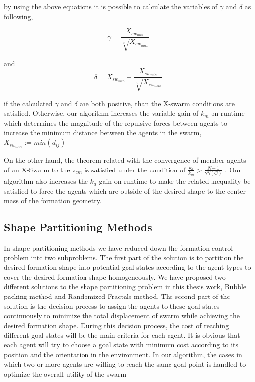 by using the above equations it is possible to calculate the variables of $\gamma$ and $\delta$ as following,

\begin{equation}
\gamma = \frac{ X_{sw_{min}}}{\sqrt[3]{ X_{sw_{max}}}}
\end{equation}
			
and
\begin{equation}
\delta =  X_{sw_{min}} - \frac{ X_{sw_{min}}}{\sqrt[3]{ X_{sw_{max}}}}
\end{equation}

if the calculated  $\gamma$ and $\delta$ are both positive, than the X-swarm conditions are satisfied. Otherwise, our algorithm increases the variable gain of $k_m$ on runtime which determines the magnitude of the repulsive forces between agents to increase the minimum distance between the agents in the swarm, $X_{sw_{min}} := min(d_{ij})$
			
On the other hand, the theorem related with the convergence of member agents of an X-Swarm to the $z_{cm}$ is satisfied under the condition of $\frac{k_a}{k_m} > \frac{N-1}{\gamma^3  l(C)}$ . Our algorithm also increases the $k_a$ gain on runtime to make the related inequality be satisfied to force the agents which are outside of the desired shape to the center mass of the formation geometry. 
					
\subsection{Shape Partitioning Methods} \label{shapepartition_ref}
In shape partitioning methods we have reduced down the formation control problem into two subproblems. The first part of the solution is to partition the desired formation shape into potential goal states according to the agent types to cover the desired formation shape homogeneously. We have proposed two different solutions to the shape partitioning problem in this thesis work, Bubble packing method and Randomized Fractals method. The second part of the solution is the decision process to assign the agents to these goal states continuously to minimize the total displacement of swarm while achieving the desired formation shape. During this decision process, the cost of reaching different goal states will be the main criteria for each agent. It is obvious that each agent will try to choose a goal state with minimum cost according to its position and the orientation in the environment. In our algorithm, the cases in which two or more agents are willing to reach the same goal point is handled to optimize the overall utility of the swarm. 

